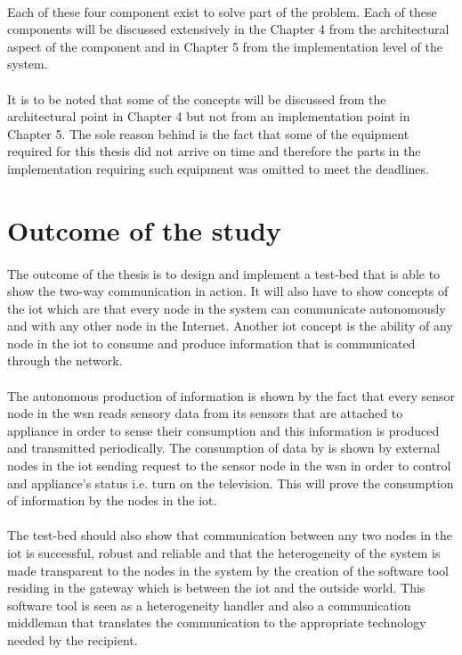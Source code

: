 \documentclass[oneside,12pt,a4paper,final]{book}
\begin{document}
\paragraph{}
Each of these four component exist to solve part of the problem. Each of these components will be discussed extensively in the Chapter 4 from the architectural aspect of the component and in Chapter 5 from the implementation level of the system. 
\paragraph{}
It is to be noted that some of the concepts will be discussed from the architectural point in Chapter 4 but not from an implementation point in Chapter 5. The sole reason behind is the fact that some of the equipment required for this thesis did not arrive on time and therefore the parts in the implementation requiring such equipment was omitted to meet the deadlines.
\section{Outcome of the study}
\paragraph{}
The outcome of the thesis is to design and implement a test-bed that is able to show the two-way communication in action. It will also have to show concepts of the \gls{iot} which are that every node in the system can communicate autonomously and with any other node in the Internet. Another \gls{iot} concept is the ability of any node in the \gls{iot} to consume and produce information that is communicated through the network.
\paragraph{}
The autonomous production of information is shown by the fact that every sensor node in the \gls{wsn} reads sensory data from its sensors that are attached to appliance in order to sense their consumption and this information is produced and transmitted periodically. The consumption of data by is shown by external nodes in the \gls{iot} sending request to the sensor node in the \gls{wsn} in order to control and appliance's status i.e. turn on the television. This will prove the consumption of information by the nodes in the \gls{iot}.
\paragraph{}
The test-bed should also show that communication between any two nodes in the \gls{iot} is successful, robust and reliable and that the heterogeneity of the system is made transparent to the nodes in the system by the creation of the software tool residing in the gateway which is between the \gls{iot} and the outside world. This software tool is seen as a heterogeneity handler and also a communication middleman that translates the communication to the appropriate technology needed by the recipient.
\end{document}
